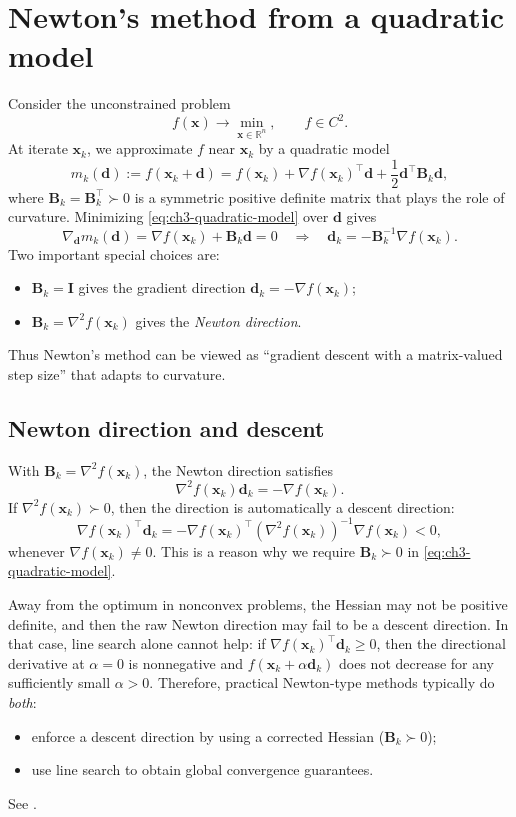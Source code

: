 \section{Newton's method from a quadratic model}
\label{sec:ch3-newton}
Consider the unconstrained problem
\[
  f(\mathbf{x})\to \min_{\mathbf{x}\in\mathbb{R}^n},\qquad f\in C^2.
\]
At iterate $\mathbf{x}_k$, we approximate $f$ near $\mathbf{x}_k$ by a quadratic
model
\begin{equation}
	  \label{eq:ch3-quadratic-model}
	  m_k(\mathbf{d})
	:= f(\mathbf{x}_k + \mathbf{d}) = f(\mathbf{x}_k) + \nabla f(\mathbf{x}_k)^\top \mathbf{d}
	  +\frac12 \mathbf{d}^\top \mathbf{B}_k \mathbf{d},
\end{equation}
where $\mathbf{B}_k=\mathbf{B}_k^\top\succ 0$ is a symmetric positive definite
matrix that plays the role of curvature. Minimizing \eqref{eq:ch3-quadratic-model}
over $\mathbf{d}$ gives
\[
  \nabla_{\mathbf{d}} m_k(\mathbf{d})
  =\nabla f(\mathbf{x}_k)+\mathbf{B}_k\mathbf{d}=0
  \quad \Longrightarrow \quad
  \mathbf{d}_k=-\mathbf{B}_k^{-1}\nabla f(\mathbf{x}_k).
\]
Two important special choices are:
\begin{itemize}
  \item $\mathbf{B}_k=\mathbf{I}$ gives the gradient direction
  $\mathbf{d}_k=-\nabla f(\mathbf{x}_k)$;
  \item $\mathbf{B}_k=\nabla^2 f(\mathbf{x}_k)$ gives the \emph{Newton direction}.
\end{itemize}
Thus Newton's method can be viewed as ``gradient descent with a
matrix-valued step size'' that adapts to curvature.

\subsection{Newton direction and descent}
With $\mathbf{B}_k=\nabla^2 f(\mathbf{x}_k)$, the Newton direction satisfies
\[
  \nabla^2 f(\mathbf{x}_k)\mathbf{d}_k = -\nabla f(\mathbf{x}_k).
\]
If $\nabla^2 f(\mathbf{x}_k)\succ 0$, then the direction is automatically a
descent direction:
\[
  \nabla f(\mathbf{x}_k)^\top \mathbf{d}_k
  =-\nabla f(\mathbf{x}_k)^\top(\nabla^2 f(\mathbf{x}_k))^{-1}\nabla f(\mathbf{x}_k) < 0,
\]
	whenever $\nabla f(\mathbf{x}_k)\neq 0$. This is a reason why we require
  $\mathbf{B}_k \succ 0$ in \cref{eq:ch3-quadratic-model}.

Away from the optimum in nonconvex problems, the Hessian may not be positive
definite, and then the raw Newton direction may fail to be a descent direction.
In that case, line search alone cannot help: if
$\nabla f(\mathbf{x}_k)^\top\mathbf{d}_k\ge 0$, then the directional derivative
at $\alpha=0$ is nonnegative and $f(\mathbf{x}_k+\alpha\mathbf{d}_k)$ does not
decrease for any sufficiently small $\alpha>0$.
Therefore, practical Newton-type methods typically do \emph{both}:
\begin{itemize}
  \item enforce a descent direction by using a corrected Hessian
  ($\mathbf{B}_k\succ 0$);
  \item use line search to obtain global convergence guarantees.
\end{itemize}
See .

